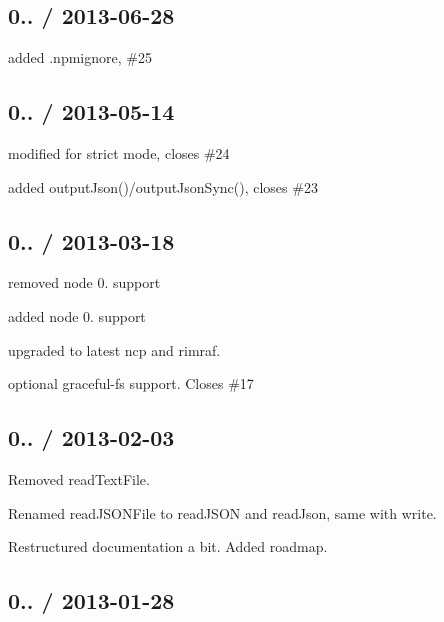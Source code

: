 \subsection*{0.. / 2013-\/06-\/28 }


\begin{DoxyItemize}
\item added .npmignore, \#25
\end{DoxyItemize}

\subsection*{0.. / 2013-\/05-\/14 }


\begin{DoxyItemize}
\item modified for {\ttfamily strict} mode, closes \#24
\item added {\ttfamily output\+Json()/output\+Json\+Sync()}, closes \#23
\end{DoxyItemize}

\subsection*{0.. / 2013-\/03-\/18 }


\begin{DoxyItemize}
\item removed node 0. support
\item added node 0. support
\item upgraded to latest {\ttfamily ncp} and {\ttfamily rimraf}.
\item optional {\ttfamily graceful-\/fs} support. Closes \#17
\end{DoxyItemize}

\subsection*{0.. / 2013-\/02-\/03 }


\begin{DoxyItemize}
\item Removed {\ttfamily read\+Text\+File}.
\item Renamed {\ttfamily read\+J\+S\+O\+N\+File} to {\ttfamily read\+J\+S\+O\+N} and {\ttfamily read\+Json}, same with write.
\item Restructured documentation a bit. Added roadmap.
\end{DoxyItemize}

\subsection*{0.. / 2013-\/01-\/28 }


